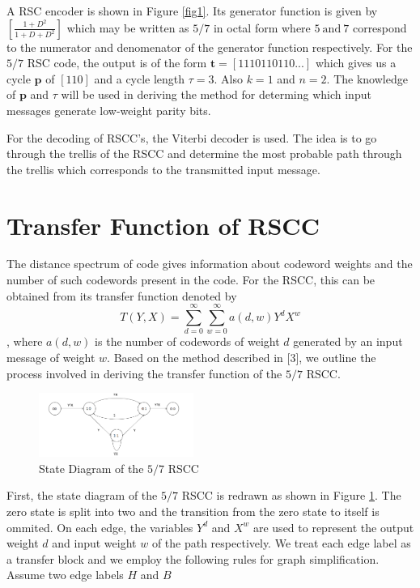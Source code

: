 \documentclass[fontsize=12pt]{article}
\begin{document}
A RSC encoder is shown in Figure \ref{fig1}. Its generator function is given by $[\frac{1+D^2}{1+D+D^2}]$ which may be written as $5/7$ in octal form where $5 ~ \text{and} ~ 7$ correspond to the numerator and denomenator of the generator function respectively. 
 For the $5/7$ RSC code, the output is of the form $\textbf{t}=[1 1 1 0 1 1 0 1 1 0 ...]$ which gives us a cycle $\textbf{p}$ of $[1 1 0]$ and a cycle length $\tau =3$. Also $k=1$ and $n=2$. The knowledge of $\textbf{p}$ and $\tau$ will be used in deriving the method for determing which input messages generate low-weight parity bits. 
 
For the decoding of RSCC's, the Viterbi decoder is used. The idea is to go through the trellis of the RSCC and determine the most probable path through the trellis which corresponds to the transmitted input message.

\section{Transfer Function of RSCC}
\label{sec3}
The distance spectrum of code gives information about codeword weights and the number of such codewords present in the code. For the RSCC, this can be obtained from its transfer function denoted by $$T(Y,X)=\sum_{d=0}^{\infty}\sum_{w=0}^{\infty} a(d,w)Y^dX^w$$,  where $a(d,w)$ is the number of codewords of weight $d$ generated by an input message of weight $w$.
Based on the method described in [3], we outline the process involved in deriving the transfer function of the $5/7$ RSCC. 

\begin{figure}[h]
\centering
		\includegraphics[width=0.45\textwidth]{tf.png}
		\caption{State Diagram of the $5/7$ RSCC }
		\label{fig4}
		\end{figure}
First, the state diagram of the $5/7$ RSCC is redrawn as shown in Figure \ref{fig4}. The zero state is split into two and the transition from the zero state to itself is ommited. On each edge, the variables $Y^d$ and $X^w$ are used to represent the output weight $d$ and input weight $w$ of the path respectively. We treat each edge label as a transfer block and we employ the following rules for graph simplification. Assume two edge labels $H$ and $B$ 
\end{document}
